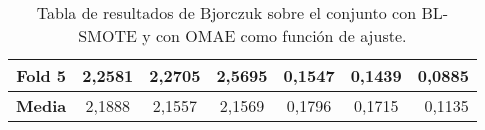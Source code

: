\begin{table}[H]
{\begin{tabular}{|crrrrrr|}
\multicolumn{1}{|c|}{\textbf{Fold 5}} & \multicolumn{1}{c|}{2,2581}            & \multicolumn{1}{c|}{2,2705}              & \multicolumn{1}{c|}{2,5695}          & \multicolumn{1}{c|}{0,1547}            & \multicolumn{1}{c|}{0,1439}              & 0,0885                             \\ \hline
\multicolumn{1}{|c|}{\textbf{Media}}  & \multicolumn{1}{c|}{2,1888}           & \multicolumn{1}{c|}{2,1557}             & \multicolumn{1}{c|}{2,1569}         & \multicolumn{1}{c|}{0,1796}            & \multicolumn{1}{c|}{0,1715}             & 0,1135                            \\ \hline
\end{tabular}%
}
\caption{Tabla de resultados de Bjorczuk sobre el conjunto con BL-SMOTE y con OMAE como función de ajuste.}\label{tablaBJORCZUKconBLSMOTEconOMAE}

\end{table}

